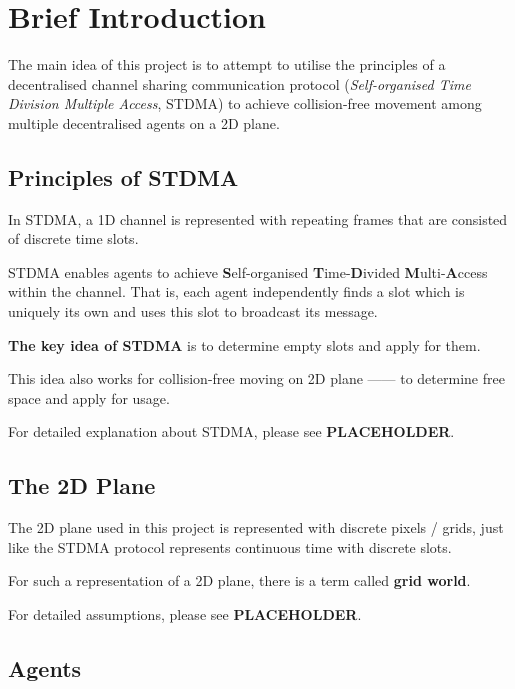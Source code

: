 \section{Brief Introduction}
The main idea of this project is to attempt to utilise the principles of a decentralised channel sharing communication protocol (\textit{Self-organised Time Division Multiple Access}, STDMA\cite{STDMA}) to achieve collision-free movement among multiple decentralised agents on a 2D plane.

\subsection{Principles of STDMA}


In STDMA, a 1D channel is represented with repeating frames that are consisted of discrete time slots.

STDMA enables agents to achieve \textbf{S}elf-organised \textbf{T}ime-\textbf{D}ivided \textbf{M}ulti-\textbf{A}ccess within the channel. That is, each agent independently finds a slot which is uniquely its own and uses this slot to broadcast its message.

\textbf{The key idea of STDMA} is to determine empty slots and apply for them.

This idea also works for collision-free moving on 2D plane —— to determine free space and apply for usage.

For detailed explanation about STDMA, please see \textbf{PLACEHOLDER}.

\subsection{The 2D Plane}

The 2D plane used in this project is represented with discrete pixels / grids, just like the STDMA protocol represents continuous time with discrete slots.

For such a representation of a 2D plane, there is a term called \textbf{grid world}\cite{GridWorld}.

For detailed assumptions, please see \textbf{PLACEHOLDER}.

\subsection{Agents}

